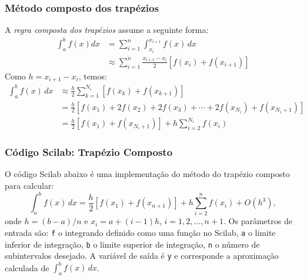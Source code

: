 \subsubsection{Método composto dos trapézios}
A \emph{regra composta dos trapézios} assume a seguinte forma:
\begin{align*}
  \int_{a}^b f(x)dx &= \sum_{i=1}^{n} \int_{x_i}^{x_{i+1}}f(x)\,dx \\
  &\approx \sum_{i=1}^{n} \frac{x_{i+1}-x_i}{2}\left[f(x_i)+f(x_{i+1})\right]
\end{align*}
Como $h = x_{i+1} - x_i$, temos:
\begin{align*}
\int_{a}^b f(x)\,dx &\approx \frac{h}{2}\sum_{k=1}^{N_i}\left[f(x_k)+f(x_{k+1})\right]\\
& = \frac{h}{2}\left[f(x_1)+2f(x_2)+2f(x_3)+\cdots + 2f(x_{N_i})+f(x_{N_i+1})\right]\\
& = \frac{h}{2}\left[f(x_1) + f(x_{N_i+1})\right] + h\sum_{i=2}^{N_i} f(x_i)
\end{align*}

\ifisscilab
\subsubsection{Código Scilab: Trapézio Composto}
O código Scilab abaixo é uma implementação do método do trapézio composto para calcular:
\begin{equation*}
  \int_a^b f(x)\,dx = \frac{h}{2}\left[f(x_1) + f(x_{n+1})\right] + h\sum_{i=2}^n f(x_i) + O(h^3),
\end{equation*}
onde $h = (b-a)/n$ e $x_i = a + (i-1)h$, $i=1,2,\dotsc,n+1$. Os parâmetros de entrada são: \verb+f+ o integrando definido como uma função no Scilab, \verb+a+ o limite inferior de integração, \verb+b+ o limite superior de integração, \verb+n+ o número de subintervalos desejado. A variável de saída é \verb+y+ e corresponde a aproximação calculada de $\int_a^b f(x)\, dx$.


\fi

